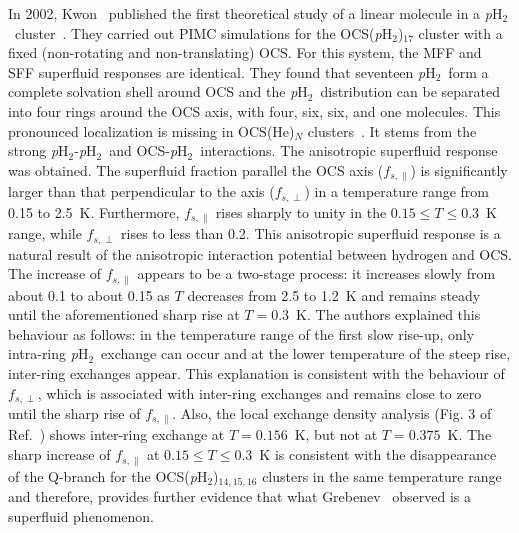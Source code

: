 \documentclass[12pt]{iopart}
\newcommand{\phtwo}{{\em p}H$_2$}
\begin{document}
In 2002, Kwon \etal~published the first theoretical study of a linear molecule in a \phtwo~cluster~\cite{kwon_OCS_pH2}. They carried out PIMC simulations for the OCS(\phtwo)$_{17}$ cluster with a fixed (non-rotating and non-translating) OCS. 
For this system, the MFF and SFF superfluid responses are identical. 
They found that seventeen \phtwo~form a complete solvation shell around OCS and the \phtwo~distribution can be separated into four rings around the OCS axis, with four, six, six, and one molecules. 
This pronounced localization is missing in OCS(He)$_N$ clusters~\cite{kwon_superfluid_helium}. 
It stems from the strong \phtwo-\phtwo~and OCS-\phtwo~interactions. 
The anisotropic superfluid response was obtained. The superfluid fraction parallel the OCS axis ($f_{s,\parallel}$) is significantly larger than that perpendicular to the axis ($f_{s,\perp}$) in a temperature range from 0.15 to 2.5~K. Furthermore, $f_{s,\parallel}$ rises  sharply to unity in the $0.15\le T \le 0.3$~K range, while $f_{s,\perp}$ rises  to less than 0.2. 
This anisotropic superfluid response is a natural result of the anisotropic interaction potential between hydrogen and OCS. 
The increase of $f_{s,\parallel}$ appears to be a two-stage process: it increases slowly from about 0.1 to about 0.15 as $T$ decreases from 2.5 to 1.2~K and remains steady until the aforementioned sharp rise at $T=0.3$~K. 
The authors explained this behaviour as follows: 
in the temperature range of the first slow rise-up, only intra-ring \phtwo~exchange can occur and at the lower temperature of the steep rise, inter-ring exchanges appear. 
This explanation is consistent with the behaviour of $f_{s,\perp}$, 
which is associated with  inter-ring exchanges and remains close to zero until the sharp rise of $f_{s,\parallel}$. Also, the local exchange density analysis (Fig. 3 of Ref.~\cite{kwon_OCS_pH2}) shows inter-ring exchange at $T=0.156$~K, but not at $T=0.375$~K. 
The sharp increase of $f_{s,\parallel}$ at $0.15\le T \le 0.3$~K is consistent with the disappearance of the Q-branch for the OCS(\phtwo)$_{14,15,16}$ clusters in the same temperature range~\cite{grebenev_OCS_pH2} and therefore, provides further evidence that what Grebenev \etal~observed is a superfluid phenomenon.
\end{document}

